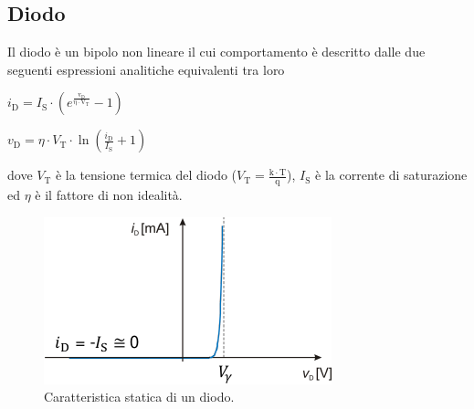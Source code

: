 \documentclass[a4paper]{article}
\begin{document}
		\subsection{Diodo}
			Il diodo è un bipolo non lineare il cui comportamento è descritto dalle due seguenti espressioni analitiche equivalenti tra loro
			\newline
			\begin{center}
				$ i_{\mathrm{D}} = I_{\mathrm{S}} \cdot (e^{\mathrm{\frac{v_{\mathrm{D}}}{\eta \cdot V_{\mathrm{T}}}}} - 1) $
			\end{center}
			\newline
			\begin{center}
				$ v_{\mathrm{D}} = \eta \cdot V_{\mathrm{T}} \cdot \ln (\frac{i_{\mathrm{D}}}{I_{\mathrm{S}}} + 1) $
			\end{center}
			dove $ V_{\mathrm{T}} $ è la tensione termica del diodo ($ V_{\mathrm{T}} = \frac{\mathrm{k \cdot T}}{\mathrm{q}} $), $ I_{\mathrm{S}} $ è la corrente di saturazione ed $ \eta $ è il fattore di non idealità.
			\begin{figure}[h!]
				\centering
				\includegraphics[scale=0.7]{caratteristicaStatica}
				\caption{Caratteristica statica di un diodo.}
				\label{fig:caratteristicaStatica}
			\end{figure}
			\newpage
\end{document}
